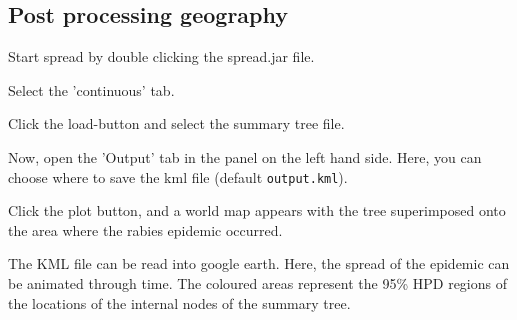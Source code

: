 \documentclass{article}
\begin{document}
\subsection*{Post processing geography}

Start spread by double clicking the spread.jar file.

Select the 'continuous' tab.

Click the load-button and select the summary tree file.

Now, open the 'Output' tab in the panel on the left hand side. Here, you can choose where to save the kml file (default {\tt output.kml}).

Click the plot button, and a world map appears with the tree superimposed onto the area where the rabies epidemic occurred.


The KML file can be read into google earth. Here, the spread of the epidemic can be animated through time. The coloured areas represent the 95\% HPD regions of the locations of the internal nodes of the summary tree.





\end{document}
